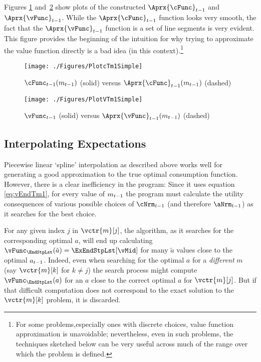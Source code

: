 Figures \ref{fig:PlotcTm1Simple} and~\ref{fig:PlotVTm1Simple} show
plots of the constructed $\Aprx{\cFunc}_{\prdT-1}$ and $\Aprx{\vFunc}_{\prdT-1}$. While the $\Aprx{\cFunc}_{\prdT-1}$ function looks very smooth, the fact that the $\Aprx{\vFunc}_{\prdT-1}$ function is a set of line segments is very evident.  This figure provides the beginning of the intuition for why trying to approximate the value function directly is a bad idea (in this context).\footnote{For some problems,especially ones with discrete choices, value function approximation is unavoidable; nevertheless, even in such problems, the techniques sketched below can be very useful across much of the range over which the problem is defined.}

\hypertarget{PlotcTm1Simple}{}
\begin{figure}
  \centerline{\texttt{[image: ./Figures/PlotcTm1Simple]}}
  \caption{$\cFunc_{\prdT-1}({m}_{\prdT-1})$ (solid) versus $\Aprx{\cFunc}_{\prdT-1}({m}_{\prdT-1})$ (dashed)}
  \label{fig:PlotcTm1Simple}
\end{figure}

\hypertarget{PlotvTm1Simple}{}
\begin{figure}
  \centerline{\texttt{[image: ./Figures/PlotVTm1Simple]}}
  \caption{$\vFunc_{\prdT-1}$ (solid) versus $\Aprx{\vFunc}_{\prdT-1}({m}_{\prdT-1})$ (dashed)}
  \label{fig:PlotVTm1Simple}
\end{figure}

\hypertarget{interpolating-expectations}{}
\subsection{Interpolating Expectations}


Piecewise linear `spline' interpolation as described above works well for generating a good approximation to the true optimal consumption function. However, there is a clear inefficiency in the program: Since it uses equation \eqref{eq:vEndTm1}, for every value of ${m}_{t-1}$ the program must calculate the utility consequences of various possible choices of $\cNrm_{\prdT-1}$ (and therefore $\aNrm_{\prdT-1}$) as it searches for the best choice.

For any given index $j$ in $\vctr{m}[j]$, the algorithm, as it searches for the corresponding optimal $a$, will end up  calculating $\vFunc_{\EndStpLst}(\tilde{a}) = \ExEndStpLst[\vMid]$ for many $\tilde{a}$ values close to the optimal ${a}_{t-1}$.  Indeed, even when searching for the optimal ${a}$ for a \emph{different} ${m}$ (say $\vctr{m}[k]$ for $k \neq j$) the search process might compute $\vFunc_{\EndStpLst}({a})$ for an ${a}$ close to the correct optimal ${a}$ for $\vctr{m}[j]$. But if that difficult computation does not correspond to the exact solution to the $\vctr{m}[k]$ problem, it is discarded.  


